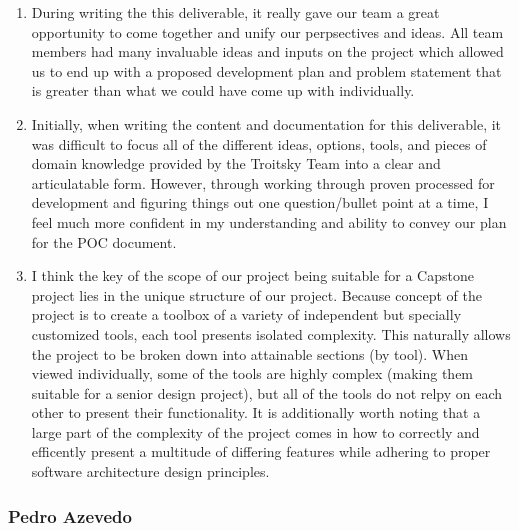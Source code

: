 \documentclass{article}
\begin{document}
\begin{enumerate}
    \item During writing the this deliverable, it really gave our team a great opportunity to come together and unify our perpsectives and ideas. All team members had many invaluable ideas and inputs on the project which allowed us to end up with a proposed development plan and problem statement that is greater than what we could have come up with individually.

    \item Initially, when writing the content and documentation for this deliverable, it was difficult to focus all of the different ideas, options, tools, and pieces of domain knowledge provided by the Troitsky Team into a clear and articulatable form. However, through working through proven processed for development and figuring things out one question/bullet point at a time, I feel much more confident in my understanding and ability to convey our plan for the POC document.

    \item I think the key of the scope of our project being suitable for a Capstone project lies in the unique structure of our project. Because concept of the project is to create a toolbox of a variety of independent but specially customized tools, each tool presents isolated complexity. This naturally allows the project to be broken down into attainable sections (by tool). When viewed individually, some of the tools are highly complex (making them suitable for a senior design project), but all of the tools do not relpy on each other to present their functionality. It is additionally worth noting that a large part of the complexity of the project comes in how to correctly and efficently present a multitude of differing features while adhering to proper software architecture design principles.
\end{enumerate} 


\subsubsection*{Pedro Azevedo}
\end{document}
